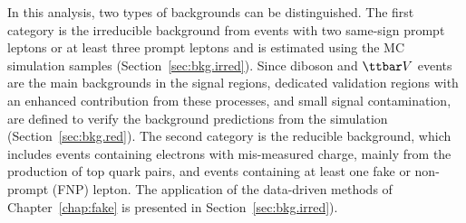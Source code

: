 In this analysis, two types of backgrounds can be distinguished.
 The first category is the irreducible background from events with two same-sign prompt 
leptons or at least three prompt leptons and is estimated using the MC simulation samples (Section~\ref{sec:bkg.irred}). 
Since diboson and $\ttbar V$ events are the main 
backgrounds in the signal regions, dedicated validation regions with an enhanced contribution from these processes, and small 
signal contamination, are defined to verify the background predictions from the simulation (Section~\ref{sec:bkg.red}). 
The second category is the reducible  
background, which includes events containing electrons with mis-measured charge, mainly from the production of top quark pairs, 
and events containing at least one fake or non-prompt (FNP) lepton.
The application of the data-driven methods of Chapter~\ref{chap:fake} 
is presented in Section~\ref{sec:bkg.irred}).

